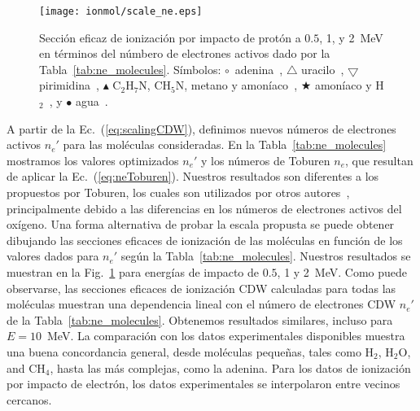 \begin{figure}[t]
\centering
\texttt{[image: ionmol/scale\_ne.eps]}
\caption[Ionización por impacto de protón en términos de $n_e'$.]
{Sección eficaz de ionización por impacto de protón a $0.5$, 1, y 2~MeV 
en términos del númbero de electrones activos dado por la 
Tabla~\ref{tab:ne_molecules}. Símbolos: 
\mbox{\Large$\circ$}~adenina~\cite{Iriki:11}, 
$\triangle$ uracilo~\cite{itoh2013}, 
$\bigtriangledown$ pirimidina~\cite{wolff2014}, 
$\blacktriangle$ C$_2$H$_7$N, CH$_5$N, metano y amoníaco~\cite{Lynch:76},
\mbox{\scriptsize$\bigstar$} amoníaco y H$_2$~\cite{Rudd:85}, y 
\mbox{\Large$\bullet$} agua~\cite{Luna2007}.}
\label{fig:recta}
\end{figure}

A partir de la Ec.~(\ref{eq:scalingCDW}), definimos nuevos números de 
electrones activos $n_e'$ para las moléculas consideradas. En la 
Tabla~\ref{tab:ne_molecules} mostramos los valores optimizados $n_e'$ y 
los números de Toburen $n_e$, que resultan de aplicar la 
Ec.~(\ref{eq:neToburen}). Nuestros resultados son diferentes a los 
propuestos por Toburen, los cuales son utilizados por otros 
autores~\cite{itoh2013}, principalmente debido a las diferencias en los 
números de electrones activos del oxígeno. Una forma alternativa de 
probar la escala propusta se puede obtener dibujando las secciones 
eficaces de ionización de las moléculas en función de los valores dados 
para $n_e'$ según la Tabla~\ref{tab:ne_molecules}. Nuestros resultados se 
muestran en la Fig.~\ref{fig:recta} para energías de impacto de $0.5$, 1 
y 2~MeV. Como puede observarse, las secciones eficaces de ionización CDW 
calculadas para todas las moléculas muestran una dependencia lineal con 
el número de electrones CDW $n_e'$ de la Tabla~\ref{tab:ne_molecules}. 
Obtenemos resultados similares, incluso para $E=10$~MeV. La comparación 
con los datos experimentales disponibles muestra una buena concordancia 
general, desde moléculas pequeñas, tales como H$_2$, H$_2$O, and CH$_4$, 
hasta las más complejas, como la adenina. Para los datos de ionización 
por impacto de electrón, los datos experimentales se interpolaron entre 
vecinos cercanos. 


